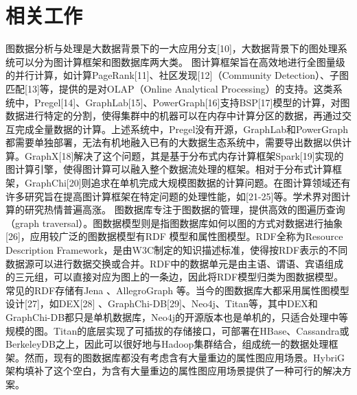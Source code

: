 
\chapter{相关工作}
图数据分析与处理是大数据背景下的一大应用分支[10]，大数据背景下的图处理系统可以分为图计算框架和图数据库两大类。
图计算框架旨在高效地进行全图量级的并行计算，如计算PageRank[11]、社区发现[12]（Community Detection）、子图匹配[13]等，提供的是对OLAP（Online Analytical Processing）的支持。这类系统中，Pregel[14]、GraphLab[15]、PowerGraph[16]支持BSP[17]模型的计算，对图数据进行特定的分割，使得集群中的机器可以在内存中计算分区的数据，再通过交互完成全量数据的计算。上述系统中，Pregel没有开源，GraphLab和PowerGraph都需要单独部署，无法有机地融入已有的大数据生态系统中，需要导出数据以供计算。GraphX[18]解决了这个问题，其是基于分布式内存计算框架Spark[19]实现的图计算引擎，使得图计算可以融入整个数据流处理的框架。相对于分布式计算框架，GraphChi[20]则追求在单机完成大规模图数据的计算问题。在图计算领域还有许多研究旨在提高图计算框架在特定问题的处理性能，如[21-25]等。学术界对图计算的研究热情普遍高涨。
图数据库专注于图数据的管理，提供高效的图遍历查询（graph traversal）。图数据模型则是指图数据库如何以图的方式对数据进行抽象 [26]，应用较广泛的图数据模型有RDF 模型和属性图模型。RDF全称为Resource Description Framework，是由W3C制定的知识描述标准，使得按RDF表示的不同数据源可以进行数据交换或合并。RDF中的数据单元是由主语、谓语、宾语组成的三元组，可以直接对应为图上的一条边，因此将RDF模型归类为图数据模型。常见的RDF存储有Jena 、AllegroGraph 等。当今的图数据库大都采用属性图模型设计[27]，如DEX[28] 、GraphChi-DB[29]、Neo4j、Titan等，其中DEX和GraphChi-DB都只是单机数据库，Neo4j的开源版本也是单机的，只适合处理中等规模的图。Titan的底层实现了可插拔的存储接口，可部署在HBase、Cassandra或BerkeleyDB之上，因此可以很好地与Hadoop集群结合，组成统一的数据处理框架。然而，现有的图数据库都没有考虑含有大量重边的属性图应用场景。HybriG架构填补了这个空白，为含有大量重边的属性图应用场景提供了一种可行的解决方案。


